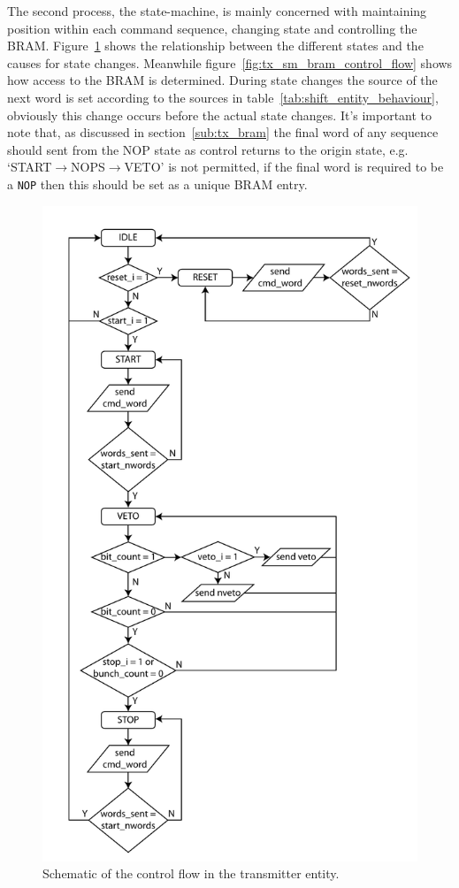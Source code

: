 The second process, the state-machine, is mainly concerned with maintaining position within each command sequence, changing state and controlling the BRAM. Figure~\ref{fig:tx_sm_flow} shows the relationship between the different states and the causes for state changes. Meanwhile figure~\ref{fig:tx_sm_bram_control_flow} shows how access to the BRAM is determined. During state changes the source of the next word is set according to the sources in table~\ref{tab:shift_entity_behaviour}, obviously this change occurs before the actual state changes. It's important to note that, as discussed in section~\ref{sub:tx_bram} the final word of any sequence should sent from the NOP state as control returns to the origin state, e.g. `START\( \rightarrow \)NOPS\( \rightarrow \)VETO' is not permitted, if the final word is required to be a \texttt{NOP} then this should be set as a unique BRAM entry. 
    
\begin{figure}[htbp]
  \centering
  \includegraphics[height=0.8\textheight]{images/pdfs/tx_sm_flow.pdf}
  \caption{Schematic of the control flow in the transmitter entity.}
  \label{fig:tx_sm_flow}
\end{figure}
  
